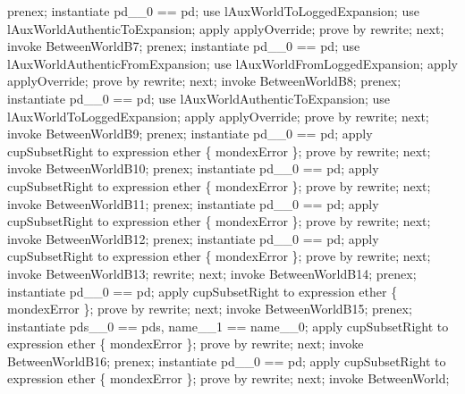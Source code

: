 \begin{LPScript}
\begin{zproof}[lPromotedBetweenWorldAbortType]
            prenex;
            instantiate pd\_\_0 == pd;
            use lAuxWorldToLoggedExpansion;
            use lAuxWorldAuthenticToExpansion;
            apply applyOverride;
            prove by rewrite;
        next;
            invoke BetweenWorldB7;
            prenex;
            instantiate pd\_\_0 == pd;
            use lAuxWorldAuthenticFromExpansion;
            use lAuxWorldFromLoggedExpansion;
            apply applyOverride;
            prove by rewrite;
        next;
            invoke BetweenWorldB8;
            prenex;
            instantiate pd\_\_0 == pd;
            use lAuxWorldAuthenticToExpansion;
            use lAuxWorldToLoggedExpansion;
            apply applyOverride;
            prove by rewrite;
        next;
            invoke BetweenWorldB9;
            prenex;
            instantiate pd\_\_0 == pd;
            apply cupSubsetRight to expression ether \cup \{ mondexError \};
            prove by rewrite;
        next;
            invoke BetweenWorldB10;
            prenex;
            instantiate pd\_\_0 == pd;
            apply cupSubsetRight to expression ether \cup \{ mondexError \};
            prove by rewrite;
        next;
            invoke BetweenWorldB11;
            prenex;
            instantiate pd\_\_0 == pd;
            apply cupSubsetRight to expression ether \cup \{ mondexError \};
            prove by rewrite;
        next;
            invoke BetweenWorldB12;
            prenex;
            instantiate pd\_\_0 == pd;
            apply cupSubsetRight to expression ether \cup \{ mondexError \};
            prove by rewrite;
        next;
            invoke BetweenWorldB13;
            rewrite;
        next;
            invoke BetweenWorldB14;
            prenex;
            instantiate pd\_\_0 == pd;
            apply cupSubsetRight to expression ether \cup \{ mondexError \};
            prove by rewrite;
        next;
            invoke BetweenWorldB15;
            prenex;
            instantiate pds\_\_0 == pds, name\_\_1 == name\_\_0;
            apply cupSubsetRight to expression ether \cup \{ mondexError \};
            prove by rewrite;
        next;
            invoke BetweenWorldB16;
            prenex;
            instantiate pd\_\_0 == pd;
            apply cupSubsetRight to expression ether \cup \{ mondexError \};
            prove by rewrite;
    next;
        invoke BetweenWorld;

\end{zproof}
\end{LPScript}

